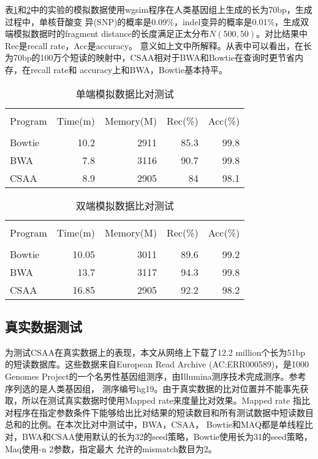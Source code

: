 表\ref{tab:singleend}和\ref{tab:pairend}中的实验的模拟数据使用wgsim程序在人类基因组上生成的长为70bp，生成过程中，单核苷酸变
异(SNP)的概率是0.09\%，indel变异的概率是0.01\%，生成双端模拟数据时的fragment distance的长度满足正太分布$N(500,50)$。对比结果中Rec是recall rate，Acc是accuracy。
意义如上文中所解释。从表中可以看出，在长为70bp的100万个短读的映射中，CSAA相对于BWA和Bowtie在查询时更节省内存，在recall rate和
accuracy上和BWA，Bowtie基本持平。%


\begin{table}[htbp]
    \caption{单端模拟数据比对测试}
    \label{tab:singleend}
    \centering
    \begin{tabular}{lrrrr}
       \toprule \\
       Program&Time(m)&Memory(M)&Rec(\%)&Acc(\%)\\
       \midrule \\
       Bowtie&10.2&2911&85.3&99.8\\
       BWA&7.8&3116&90.7&99.8\\
       CSAA&8.9&2905&84&98.1\\
       \bottomrule
    \end{tabular}
\end{table}


\begin{table}[htbp]
    \caption{双端模拟数据比对测试}
    \label{tab:pairend}
    \centering
    \begin{tabular}{lrrrr}
       \toprule \\
       Program&Time(m)&Memory(M)&Rec(\%)&Acc(\%)\\
       \midrule \\
       Bowtie&10.05&3011&89.6&99.2\\
       BWA&13.7&3117&94.3&99.8\\
       CSAA&16.85&2905&92.2&98.2\\
       \bottomrule
    \end{tabular}
\end{table}

\subsection{真实数据测试}
为测试CSAA在真实数据上的表现，本文从网络上下载了12.2 million个长为51bp的短读数据库。这些数据来自European Read Archive
(AC:ERR000589)，是1000 Genomes Project的一个名男性基因组测序，由Illumina测序技术完成测序。参考序列选的是人类基因组，
测序编号hg19。由于真实数据的比对位置并不能事先获取，所以在测试真实数据时使用Mapped rate来度量比对效果。Mapped rate
指比对程序在指定参数条件下能够给出比对结果的短读数目和所有测试数据中短读数目总和的比例。在本次比对中测试中，BWA，CSAA，
Bowtie和MAQ都是单线程比对，BWA和CSAA使用默认的长为32的seed策略，Bowtie使用长为31的seed策略，Maq使用-n 2参数，指定最大
允许的mismatch数目为2。

